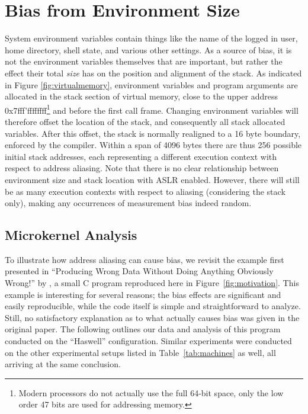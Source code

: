 \documentclass{acm_proc_article-sp}
\begin{document}
\section{Bias from Environment Size}
\label{sec:environment}
System environment variables contain things like the name of the logged in user, home directory, shell state, and various other settings.
As a source of bias, it is not the environment variables themselves that are important, but rather the effect their total \emph{size} has on the position and alignment of the stack.
As indicated in Figure \ref{fig:virtualmemory}, environment variables and program arguments are allocated in the stack section of virtual memory, close to the upper address 0x7fff'ffffffff\footnote{Modern processors do not actually use the full 64-bit space, only the low order 47 bits are used for addressing memory.} and before the first call frame.
Changing environment variables will therefore offset the location of the stack, and consequently all stack allocated variables.
After this offset, the stack is normally realigned to a 16 byte boundary, enforced by the compiler.
Within a span of 4096 bytes there are thus 256 possible initial stack addresses, each representing a different execution context with respect to address aliasing. 
Note that there is no clear relationship between environment size and stack location with ASLR enabled.
However, there will still be as many execution contexts with respect to aliasing (considering the stack only), making any occurrences of measurement bias indeed random.

\subsection{Microkernel Analysis}
\label{sec:microkernel}
To illustrate how address aliasing can cause bias, we revisit the example first presented in ``Producing Wrong Data Without Doing Anything Obviously Wrong!'' by , a small C program reproduced here in Figure~\ref{fig:motivation}.
This example is interesting for several reasons; the bias effects are significant and easily reproducible, while the code itself is simple and straightforward to analyze.
Still, no satisfactory explanation as to what actually causes bias was given in the original paper.
The following outlines our data and analysis of this program conducted on the ``Haswell'' configuration.
Similar experiments were conducted on the other experimental setups listed in Table~\ref{tab:machines} as well, all arriving at the same conclusion.
\end{document}
